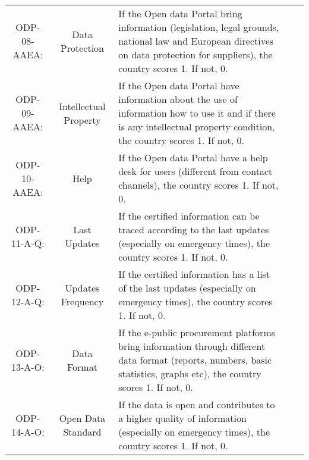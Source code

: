 \documentclass[a4paper, twoside]{report}
\begin{document}
\begin{table}[htbp]
\begin{adjustbox}{max width=\linewidth}
\begin{tabular}{ccp{30em}p{35em}p{31.335em}}
    ODP-08-AAEA: & Data Protection & If the Open data Portal bring information (legislation, legal grounds, national law and European directives on data protection for suppliers), the country scores 1. If not, 0. \\
    ODP-09-AAEA: & Intellectual Property & If the Open data Portal have information about the use of information how to use it and if there is any intellectual property condition, the country scores 1. If not, 0. \\
    ODP-10-AAEA: & Help  & If the Open data Portal have a help desk for users (different from contact channels), the country scores 1. If not, 0. \\
    \midrule
    ODP-11-A-Q: & \cellcolor[rgb]{ .749,  .749,  .749}Last Updates & \cellcolor[rgb]{ .749,  .749,  .749}If the certified information can be traced according to the last updates (especially on emergency times), the country scores 1. If not, 0.  \\
    ODP-12-A-Q: & \cellcolor[rgb]{ .749,  .749,  .749}Updates Frequency & \cellcolor[rgb]{ .749,  .749,  .749}If the certified information has a list of the last updates (especially on emergency times), the country scores 1. If not, 0. \\
    \midrule
    ODP-13-A-O: & Data Format & If the e-public procurement platforms bring information through different data format (reports, numbers, basic statistics, graphs etc), the country scores 1. If not, 0. \\
    ODP-14-A-O: & \cellcolor[rgb]{ .749,  .749,  .749}Open Data Standard & \cellcolor[rgb]{ .749,  .749,  .749}If the data is open and contributes to a higher quality of information (especially on emergency times), the country scores 1. If not, 0.  \\
    \bottomrule
    \end{tabular}%
    \end{adjustbox}
  \label{tab:definitions4}%
\end{table}%
\end{document}
